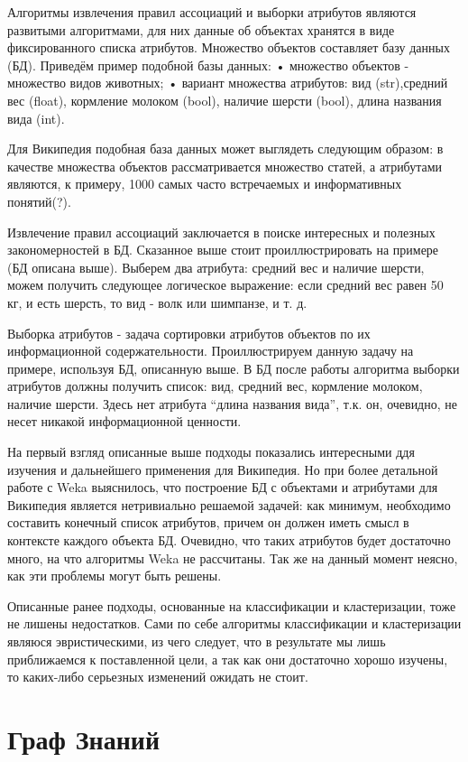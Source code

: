 Алгоритмы извлечения правил ассоциаций и выборки атрибутов являются развитыми алгоритмами,
для них данные об объектах хранятся в виде фиксированного списка атрибутов. Множество объектов
составляет базу данных (БД). Приведём пример подобной базы данных:
•	множество объектов - множество видов животных;
•	вариант множества атрибутов: вид (str),средний вес (float), кормление молоком (bool),
наличие шерсти (bool), длина названия вида (int).

Для Википедия подобная база данных может выглядеть следующим образом: в качестве множества
объектов рассматривается множество статей, а атрибутами являются, к примеру, 1000 самых часто
встречаемых и информативных понятий(?). 

Извлечение правил ассоциаций заключается в поиске интересных и полезных закономерностей в БД.
Сказанное выше стоит проиллюстрировать на примере (БД описана выше). Выберем два атрибута: средний 
вес и наличие шерсти, можем получить следующее логическое выражение: если средний вес равен 
50 кг, и есть шерсть, то вид - волк или шимпанзе, и т. д.

Выборка атрибутов - задача сортировки атрибутов объектов по их информационной содержательности.
Проиллюстрируем данную задачу на примере, используя БД, описанную выше. В БД после работы 
алгоритма выборки атрибутов должны получить список: вид, средний вес, кормление молоком, 
наличие шерсти. Здесь нет атрибута “длина названия вида”, т.к. он, очевидно, не несет
никакой информационной ценности.

На первый взгляд описанные выше подходы показались интересными ддя изучения и дальнейшего
применения для Википедия. Но при более детальной работе с Weka выяснилось, что
построение БД с объектами и атрибутами для Википедия является нетривиально решаемой задачей:
как минимум, необходимо составить конечный список атрибутов, причем он должен иметь смысл 
в контексте каждого объекта БД. Очевидно, что таких атрибутов будет достаточно много,
на что алгоритмы Weka не рассчитаны. Так же на данный момент неясно, как эти проблемы
могут быть решены.
 
Описанные ранее подходы, основанные на классификации и кластеризации, тоже не лишены недостатков.
Сами по себе алгоритмы классификации и кластеризации являюся эвристическими, из чего следует, что
в результате мы лишь приближаемся к поставленной цели, а так как они достаточно хорошо изучены, то 
каких-либо серьезных изменений ожидать не стоит.

\section {Граф Знаний}
 

